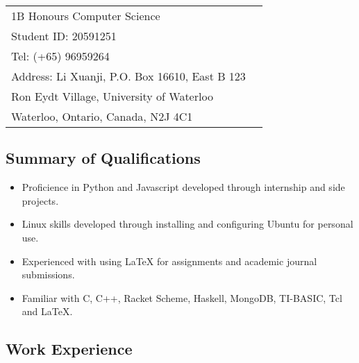 \documentclass[letterpaper]{article}
\def\name{Li Xuanji}
\begin{document}
\vspace{0.25in}

\begin{minipage}{0.65\linewidth}
\resizebox{0.5\linewidth}{!}{\fontsize{30}{36}\selectfont \name}
\end{minipage}
\begin{minipage}{0.2\linewidth}
  \begin{tabular}{ll}
  1B Honours Computer Science \\
  Student ID: 20591251 \\
  Tel: (+65) 96959264 \\
  Address: Li Xuanji, P.O. Box 16610, East B 123 \\
  Ron Eydt Village, University of Waterloo \\
  Waterloo, Ontario, Canada, N2J 4C1 \\
  \end{tabular}
\end{minipage}

\vspace{2em}


\begin{center}
\section*{Summary of Qualifications}
\end{center}

\begin{itemize}
\setlength\itemsep{0em}
\item Proficience in Python and Javascript developed through internship and side projects.
\item Linux skills developed through installing and configuring Ubuntu for personal use.
\item Experienced with using LaTeX for assignments and academic journal submissions.
\item Familiar with C, C++, Racket Scheme, Haskell, MongoDB, TI-BASIC, Tcl and LaTeX.
\end{itemize}

\vspace{2em}

\begin{center}
\section*{Work Experience}
\end{center}
\end{document}
